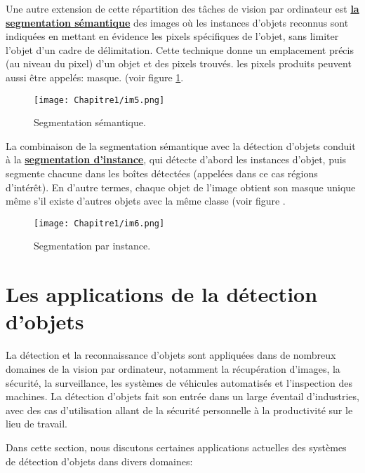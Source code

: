 Une autre extension de cette répartition des tâches de vision par ordinateur est \underline{\textbf{la segmentation sémantique}}  des images où les instances d'objets reconnus sont indiquées en mettant en évidence les pixels spécifiques de l'objet,  sans limiter l'objet d'un cadre de délimitation.  Cette technique donne un emplacement précis (au niveau du pixel) d'un objet et des pixels trouvés. les pixels produits peuvent aussi être appelés: masque.
(voir figure \ref{im5}.


\begin{figure}[H]
\centering
\texttt{[image: Chapitre1/im5.png]}
\caption{Segmentation sémantique.}
\label{im5}
\end{figure}

La combinaison de la segmentation sémantique avec la détection d'objets conduit à la \underline{\textbf{segmentation d'instance}}, qui détecte d'abord les instances d'objet, puis segmente chacune dans les boîtes détectées (appelées dans ce cas régions d'intérêt). En d'autre termes, chaque objet de l'image obtient son masque unique même s'il existe d'autres objets avec la même classe (voir figure .    

\begin{figure}[H]
\centering
\texttt{[image: Chapitre1/im6.png]}
\caption{Segmentation par instance.}
\label{im6}
\end{figure}     


\section{Les applications de la détection d'objets}
La détection et la reconnaissance d'objets sont appliquées dans de nombreux domaines de la vision par ordinateur, notamment la récupération d'images, la sécurité, la surveillance, les systèmes de véhicules automatisés et l'inspection des machines. La détection d'objets fait son entrée dans un large éventail d'industries, avec des cas d'utilisation allant de la sécurité personnelle à la productivité sur le lieu de travail.

Dans cette section, nous discutons  certaines applications actuelles  des systèmes de détection d'objets dans divers domaines:
